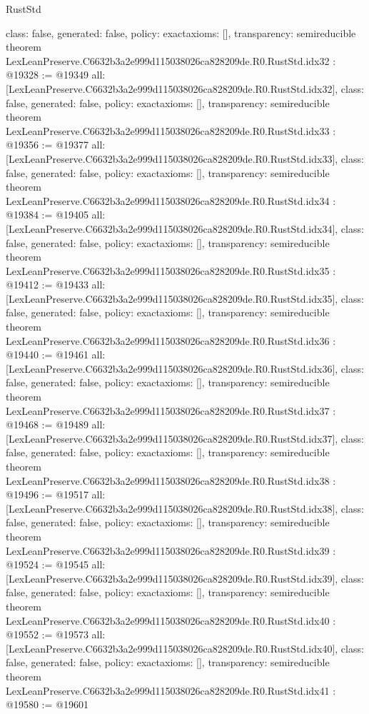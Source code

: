 \begin{lexlean}{RustStd}
\begin{coremodule}
{  class: false,
  generated: false,
  policy: exact{axioms: []},
  transparency: semireducible
}
theorem LexLeanPreserve.C6632b3a2e999d115038026ca828209de.R0.RustStd.idx32 : @19328 := @19349 {
  all: [LexLeanPreserve.C6632b3a2e999d115038026ca828209de.R0.RustStd.idx32],
  class: false,
  generated: false,
  policy: exact{axioms: []},
  transparency: semireducible
}
theorem LexLeanPreserve.C6632b3a2e999d115038026ca828209de.R0.RustStd.idx33 : @19356 := @19377 {
  all: [LexLeanPreserve.C6632b3a2e999d115038026ca828209de.R0.RustStd.idx33],
  class: false,
  generated: false,
  policy: exact{axioms: []},
  transparency: semireducible
}
theorem LexLeanPreserve.C6632b3a2e999d115038026ca828209de.R0.RustStd.idx34 : @19384 := @19405 {
  all: [LexLeanPreserve.C6632b3a2e999d115038026ca828209de.R0.RustStd.idx34],
  class: false,
  generated: false,
  policy: exact{axioms: []},
  transparency: semireducible
}
theorem LexLeanPreserve.C6632b3a2e999d115038026ca828209de.R0.RustStd.idx35 : @19412 := @19433 {
  all: [LexLeanPreserve.C6632b3a2e999d115038026ca828209de.R0.RustStd.idx35],
  class: false,
  generated: false,
  policy: exact{axioms: []},
  transparency: semireducible
}
theorem LexLeanPreserve.C6632b3a2e999d115038026ca828209de.R0.RustStd.idx36 : @19440 := @19461 {
  all: [LexLeanPreserve.C6632b3a2e999d115038026ca828209de.R0.RustStd.idx36],
  class: false,
  generated: false,
  policy: exact{axioms: []},
  transparency: semireducible
}
theorem LexLeanPreserve.C6632b3a2e999d115038026ca828209de.R0.RustStd.idx37 : @19468 := @19489 {
  all: [LexLeanPreserve.C6632b3a2e999d115038026ca828209de.R0.RustStd.idx37],
  class: false,
  generated: false,
  policy: exact{axioms: []},
  transparency: semireducible
}
theorem LexLeanPreserve.C6632b3a2e999d115038026ca828209de.R0.RustStd.idx38 : @19496 := @19517 {
  all: [LexLeanPreserve.C6632b3a2e999d115038026ca828209de.R0.RustStd.idx38],
  class: false,
  generated: false,
  policy: exact{axioms: []},
  transparency: semireducible
}
theorem LexLeanPreserve.C6632b3a2e999d115038026ca828209de.R0.RustStd.idx39 : @19524 := @19545 {
  all: [LexLeanPreserve.C6632b3a2e999d115038026ca828209de.R0.RustStd.idx39],
  class: false,
  generated: false,
  policy: exact{axioms: []},
  transparency: semireducible
}
theorem LexLeanPreserve.C6632b3a2e999d115038026ca828209de.R0.RustStd.idx40 : @19552 := @19573 {
  all: [LexLeanPreserve.C6632b3a2e999d115038026ca828209de.R0.RustStd.idx40],
  class: false,
  generated: false,
  policy: exact{axioms: []},
  transparency: semireducible
}
theorem LexLeanPreserve.C6632b3a2e999d115038026ca828209de.R0.RustStd.idx41 : @19580 := @19601 {
}
\end{coremodule}
\end{lexlean}
